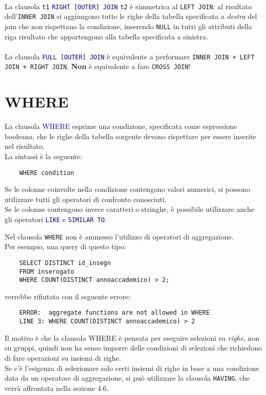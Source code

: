 \documentclass[12pt,a4paper]{book}
\begin{document}
	\paragraph{}La clausola \texttt{t1} \textcolor{blue}{\texttt{RIGHT [OUTER] JOIN}} \texttt{t2} è simmetrica al \texttt{LEFT JOIN}: al risultato dell'\texttt{INNER JOIN} si aggiungono tutte le righe della tabella specificata a \textit{destra} del join che non rispettano la condizione, inserendo \texttt{NULL} in tutti gli attributi della riga risultato che appartengono alla tabella specificata a sinistra.
	\paragraph{}La clausola \textcolor{blue}{\texttt{FULL [OUTER] JOIN}} è equivalente a performare \texttt{INNER JOIN + LEFT JOIN + RIGHT JOIN}. \textbf{Non} è equivalente a fare \texttt{CROSS JOIN}!
	\section{WHERE}
	La clausola \textcolor{blue}{WHERE} esprime una condizione, specificata come espressione booleana, che le righe della tabella sorgente devono rispettare per essere inserite nel risultato.\\La sintassi è la seguente:
	\begin{lstlisting}
	WHERE condition
	\end{lstlisting}
	Se le colonne coinvolte nella condizione contengono valori numerici, si possono utilizzare tutti gli operatori di confronto conosciuti.\\
	Se le colonne contengono invece caratteri o stringhe, è possibile utilizzare anche gli operatori \textcolor{blue}{\texttt{LIKE}} e \textcolor{blue}{\texttt{SIMILAR TO}}.\\
	\begin{tcolorbox}[enhanced jigsaw, breakable, title=Attenzione! WHERE e operatori di aggregazione, colframe=red!70!black]
	Nel clausola \texttt{WHERE} non è ammesso l'utilizzo di operatori di aggregazione.\\Per esempio, una query di questo tipo:
	\begin{lstlisting}
	SELECT DISTINCT id_insegn
	FROM inserogato
	WHERE COUNT(DISTINCT annoaccademico) > 2; 
	\end{lstlisting}
	verrebbe rifiutata con il seguente errore:
	\begin{lstlisting}
	ERROR:  aggregate functions are not allowed in WHERE
	LINE 3: WHERE COUNT(DISTINCT annoaccademico) > 2
	\end{lstlisting}
	Il motivo è che la clausola WHERE è pensata per eseguire selezioni su \textit{righe}, non su gruppi, quindi non ha senso imporre delle condizioni di selezioni che richiedono di fare operazioni su insiemi di righe.\\Se c'è l'esigenza di selezionare solo certi insiemi di righe in base a una condizione data da un operatore di aggregazione, si può utilizzare la clausola \texttt{HAVING}, che verrà affrontata nella sezione 4.6.
	\end{tcolorbox}
\end{document}
